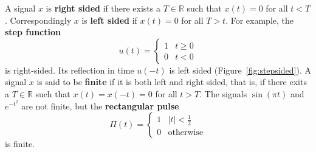 \documentclass[11pt,a4paper]{book}
\theoremstyle{plain}
\numberwithin{equation}{section}
\newcommand{\reals}{{\mathbb R}}
\newcommand{\term}{\textbf}
\newcommand{\abs}[1]{\left\vert #1 \right\vert}
\begin{document}
\newcommand{\rect}{\Pi}

A signal $x$ is \term{right sided} if there exists a $T \in \reals$ such that $x(t) = 0$ for all $t < T$.  Correspondingly $x$ is \term{left sided} if $x(t) = 0$ for all $T > t$.  For example, the \term{step function} 
\begin{equation} \label{eq:stepfunction}
u(t) = \begin{cases}
1 & t \geq 0 \\
0 & t < 0
\end{cases}
\end{equation}
is right-sided.  Its reflection in time $u(-t)$ is left sided (Figure~\ref{fig:stepsided}).  A signal $x$ is said to be \term{finite} if it is both left and right sided, that is, if there exits a $T\in\reals$ such that $x(t) = x(-t) = 0$ for all $t > T$.  The signals $\sin( \pi t)$ and $e^{-t^2}$ are not finite, but the \term{rectangular pulse}
\begin{equation}\label{eq:rectfuncdefn}
\rect(t) = \begin{cases} 
1 & \abs{t} < \frac{1}{2}\\
0 & \text{otherwise}
\end{cases}
\end{equation}
is finite.  %
\end{document}
